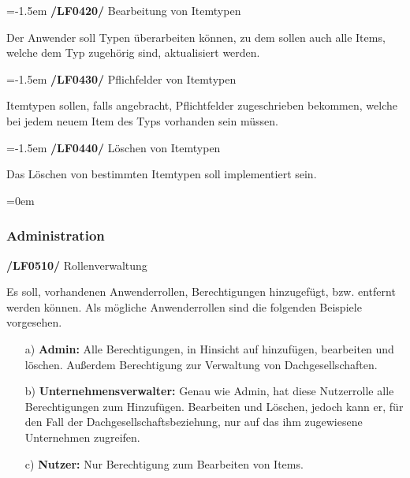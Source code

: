 \documentclass[11pt,a4paper]{report}
\begin{document}
\leftskip=-1.5em
\textbf{/LF0420/} Bearbeitung von Itemtypen
\par
\begingroup
\leftskip=1cm
\noindent Der Anwender soll Typen überarbeiten können, zu dem sollen auch alle Items, welche dem Typ zugehörig sind, aktualisiert werden.\\
\par
\endgroup

\leftskip=-1.5em
\textbf{/LF0430/} Pflichfelder von Itemtypen
\par
\begingroup
\leftskip=1cm
\noindent Itemtypen sollen, falls angebracht, Pflichtfelder zugeschrieben bekommen, welche bei jedem neuem Item des Typs vorhanden sein müssen.\\
\par
\endgroup

\leftskip=-1.5em
\textbf{/LF0440/} Löschen von Itemtypen
\par
\begingroup
\leftskip=1cm
\noindent Das Löschen von bestimmten Itemtypen soll implementiert sein.\\
\par
\endgroup

\newpage
\leftskip=0em
\subsubsection{Administration}

\textbf{/LF0510/} Rollenverwaltung
\par
\begingroup
\leftskip=1cm
\noindent Es soll, vorhandenen Anwenderrollen, Berechtigungen hinzugefügt, bzw. entfernt werden können. 
Als mögliche Anwenderrollen sind die folgenden Beispiele vorgesehen.\\
\begin{enumerate}
\leftskip=3em
\item[a)] \textbf{Admin:} Alle Berechtigungen, in Hinsicht auf hinzufügen, bearbeiten und löschen. 
Außerdem Berechtigung zur Verwaltung von Dachgesellschaften.\\
\item[b)] \textbf{Unternehmensverwalter:} Genau wie Admin, hat diese Nutzerrolle alle Berechtigungen zum Hinzufügen. 
Bearbeiten und Löschen, jedoch kann er, für den Fall der Dachgesellschaftsbeziehung, nur auf das ihm zugewiesene Unternehmen zugreifen.\\ 
\item[c)] \textbf{Nutzer:} Nur Berechtigung zum Bearbeiten von Items.\\
\end{enumerate}
\par
\endgroup
\end{document}

